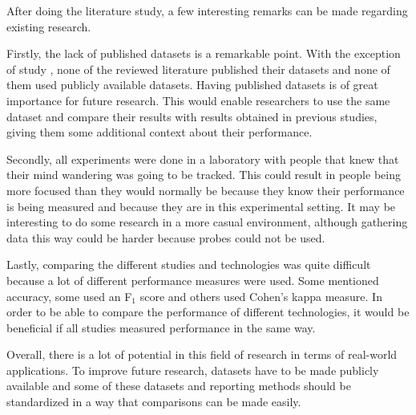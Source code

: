 After doing the literature study, a few interesting remarks can be made regarding existing research.

Firstly, the lack of published datasets is a remarkable point. With the exception of study \cite{Zhao2017ScalableApproach}, none of the reviewed literature published their datasets and none of them used publicly available datasets. Having published datasets is of great importance for future research. This would enable researchers to use the same dataset and compare their results with results obtained in previous studies, giving them some additional context about their performance.

Secondly, all experiments were done in a laboratory with people that knew that their mind wandering was going to be tracked. This could result in people being more focused than they would normally be because they know their performance is being measured and because they are in this experimental setting. It may be interesting to do some research in a more casual environment, although gathering data this way could be harder because probes could not be used.

Lastly, comparing the different studies and technologies was quite difficult because a lot of different performance measures were used. Some mentioned accuracy, some used an F$_1$ score and others used Cohen's kappa measure. In order to be able to compare the performance of different technologies, it would be beneficial if all studies measured performance in the same way.  

Overall, there is a lot of potential in this field of research in terms of real-world applications. To improve future research, datasets have to be made publicly available and some of these datasets and reporting methods should be standardized in a way that comparisons can be made easily.